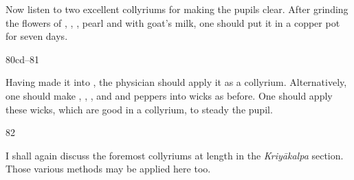 \begin{translation}
    Now listen to two excellent collyriums for making the pupils clear.  
After grinding the flowers of ,
,  
, pearl and  with goat's milk, 
one should put it in a copper pot for seven days.

\item[80cd--81]

Having made it into , the physician should apply it as a collyrium.  
Alternatively, one should make 
, 
,
, and 
and peppers into wicks as before.  One should apply these wicks, which are good in a 
collyrium, to steady the pupil. 

\item[82]

I shall again discuss the foremost collyriums at length in the \emph{Kriyākalpa} section. 
Those various methods may be applied here too. 
    
    
    \end{translation}
    
    
    
    